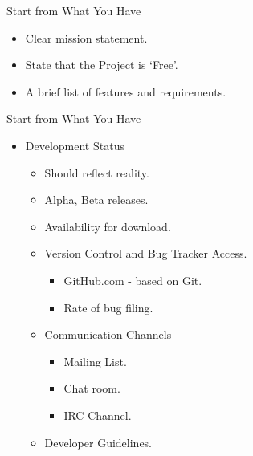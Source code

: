 \documentclass{beamer}
\begin{document}
\begin{frame}{Start from What You Have}
\begin{itemize}
	\item Clear mission statement.\pause
	\item State that the Project is `Free'. \pause
	\item A brief list of features and requirements.
\end{itemize}
\end{frame}

\begin{frame}{Start from What You Have}
\begin{itemize}
	\item Development Status \pause
	\begin{itemize}
		\item Should reflect reality.\pause
		\item Alpha, Beta releases. \pause
		\item Availability for download. \pause
		\item Version Control and Bug Tracker Access. \pause
		\begin{itemize}
			\item GitHub.com - based on Git. \pause
			\item Rate of bug filing. \pause
		\end{itemize}
		\item Communication Channels
		\begin{itemize}
			\item Mailing List. \pause
			\item Chat room. \pause
			\item IRC Channel. \pause
		\end{itemize}
		\item Developer Guidelines. 
	\end{itemize}		
\end{itemize}
\end{frame}
\end{document}
